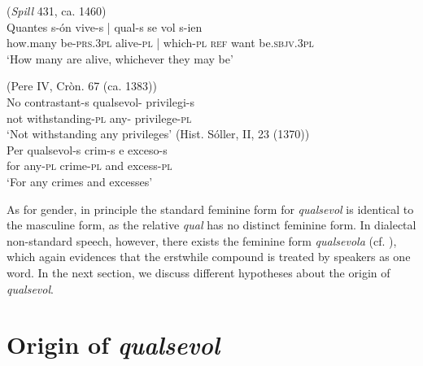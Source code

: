 \documentclass[output=paper,colorlinks,citecolor=brown]{langscibook}
\begin{document}
\ea \label{ex:ka6}
 \ea\label{ex:ka6a}(\textit{Spill} 431, ca. 1460)\\
     \gll Quantes s-ón vive-s | qual-s se vol s-ien\\
        how.many be-\textsc{prs.3pl} alive-\textsc{pl} | which-\textsc{pl} \textsc{ref} want be.\textsc{sbjv.3pl}\\
        \glt ‘How many are alive, whichever they may be’

\ex\label{ex:ka6b}(Pere IV, Cròn. 67 (ca. 1383))\\
\gll No contrastant-s qualsevol-{\emptyset} privilegi-s\\
        not withstanding-\textsc{pl} any-{\emptyset} privilege-\textsc{pl}\\
        \glt ‘Not withstanding any privileges’
\ex\label{ex:ka6c}(Hist. Sóller, II, 23 (1370))\\
        \gll Per qualsevol-s crim-s e exceso-s\\
        for any-\textsc{pl} crime-\textsc{pl} and excess-\textsc{pl}\\
        \glt ‘For any crimes and excesses’
\z
\z

As for gender, in principle the standard feminine form for \textit{qualsevol} is identical to the masculine form, as the relative \textit{qual} has no distinct feminine form. In dialectal non-standard speech, however, there exists the feminine form \textit{qualsevola} (cf. \cite{Alcovermoll1962}), which again evidences that the erstwhile compound is treated by speakers as one word. In the next section, we discuss different hypotheses about the origin of \textit{qualsevol}.


\section{Origin of \textit{qualsevol}}\label{sec:kea3}
\end{document}
